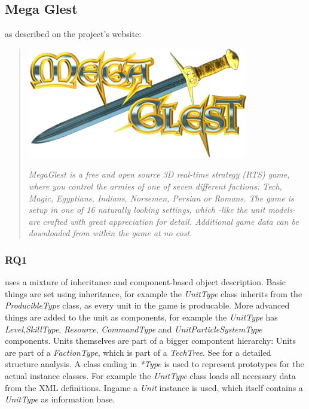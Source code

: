 \subsection{Mega Glest}
\GLEST{} as described on the project's website:
\begin{quote}

\begin{center}\includegraphics[scale=0.5]{pics/glestlogo}\end{center}

\textit{MegaGlest is a free and open source 3D real-time strategy (RTS) game, where you control the armies of one of
seven different factions: Tech, Magic, Egyptians, Indians, Norsemen, Persian or Romans. The game is setup in one of 16
naturally looking settings, which -like the unit models- are crafted with great appreciation for detail. Additional game
data can be downloaded from within the game at no cost.}
\end{quote}

\subsubsection{RQ1}
\GLEST{} uses a mixture of inheritance and component-based object description. Basic things are set using
inheritance, for example the \textit{UnitType} class inherits from the \textit{ProducibleType} class, as every unit in
the game is producable. More advanced things are added to the unit as components, for example the \textit{UnitType} has
\textit{Level},\textit{SkillType}, \textit{Resource}, \textit{CommandType} and \textit{UnitParticleSystemType}
components. Units themselves are part of a bigger compontent hierarchy: Units are part of a \textit{FactionType}, which
is part of a \textit{TechTree}. See  for a detailed structure analysis. A class ending in
\textit{*Type} is used to represent prototypes for the actual instance classes. For example the \textit{UnitType} class loads all
necessary data from the XML definitions. Ingame a \textit{Unit} instance is used, which itself contains a
\textit{UnitType} as information base.

